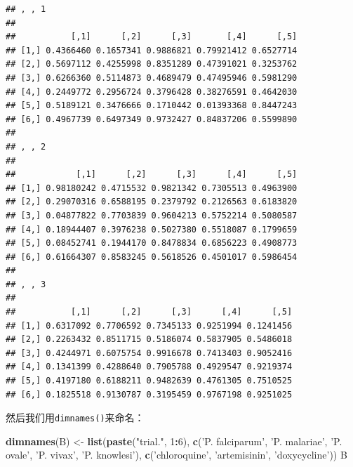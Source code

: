 \documentclass[]{book}
\newenvironment{Shaded}{\begin{snugshade}}{\end{snugshade}}
\newcommand{\DecValTok}[1]{\textcolor[rgb]{0.00,0.00,0.81}{#1}}
\newcommand{\KeywordTok}[1]{\textcolor[rgb]{0.13,0.29,0.53}{\textbf{#1}}}
\newcommand{\NormalTok}[1]{#1}
\newcommand{\OperatorTok}[1]{\textcolor[rgb]{0.81,0.36,0.00}{\textbf{#1}}}
\newcommand{\StringTok}[1]{\textcolor[rgb]{0.31,0.60,0.02}{#1}}
\begin{document}
\begin{verbatim}
## , , 1
## 
##           [,1]      [,2]      [,3]       [,4]      [,5]
## [1,] 0.4366460 0.1657341 0.9886821 0.79921412 0.6527714
## [2,] 0.5697112 0.4255998 0.8351289 0.47391021 0.3253762
## [3,] 0.6266360 0.5114873 0.4689479 0.47495946 0.5981290
## [4,] 0.2449772 0.2956724 0.3796428 0.38276591 0.4642030
## [5,] 0.5189121 0.3476666 0.1710442 0.01393368 0.8447243
## [6,] 0.4967739 0.6497349 0.9732427 0.84837206 0.5599890
## 
## , , 2
## 
##            [,1]      [,2]      [,3]      [,4]      [,5]
## [1,] 0.98180242 0.4715532 0.9821342 0.7305513 0.4963900
## [2,] 0.29070316 0.6588195 0.2379792 0.2126563 0.6183820
## [3,] 0.04877822 0.7703839 0.9604213 0.5752214 0.5080587
## [4,] 0.18944407 0.3976238 0.5027380 0.5518087 0.1799659
## [5,] 0.08452741 0.1944170 0.8478834 0.6856223 0.4908773
## [6,] 0.61664307 0.8583245 0.5618526 0.4501017 0.5986454
## 
## , , 3
## 
##           [,1]      [,2]      [,3]      [,4]      [,5]
## [1,] 0.6317092 0.7706592 0.7345133 0.9251994 0.1241456
## [2,] 0.2263432 0.8511715 0.5186074 0.5837905 0.5486018
## [3,] 0.4244971 0.6075754 0.9916678 0.7413403 0.9052416
## [4,] 0.1341399 0.4288640 0.7905788 0.4929547 0.9219374
## [5,] 0.4197180 0.6188211 0.9482639 0.4761305 0.7510525
## [6,] 0.1825518 0.9130787 0.3195459 0.9767198 0.9251025
\end{verbatim}

然后我们用\texttt{dimnames()}来命名：

\begin{Shaded}
\begin{Highlighting}[]
\KeywordTok{dimnames}\NormalTok{(B) <-}\StringTok{ }\KeywordTok{list}\NormalTok{(}\KeywordTok{paste}\NormalTok{(}\StringTok{"trial."}\NormalTok{, }\DecValTok{1}\OperatorTok{:}\DecValTok{6}\NormalTok{), }\KeywordTok{c}\NormalTok{(}\StringTok{'P. falciparum'}\NormalTok{, }\StringTok{'P. malariae'}\NormalTok{, }\StringTok{'P. ovale'}\NormalTok{, }\StringTok{'P. vivax'}\NormalTok{, }\StringTok{'P. knowlesi'}\NormalTok{), }\KeywordTok{c}\NormalTok{(}\StringTok{'chloroquine'}\NormalTok{, }\StringTok{'artemisinin'}\NormalTok{, }\StringTok{'doxycycline'}\NormalTok{))}
\NormalTok{B}
\end{Highlighting}
\end{Shaded}
\end{document}
